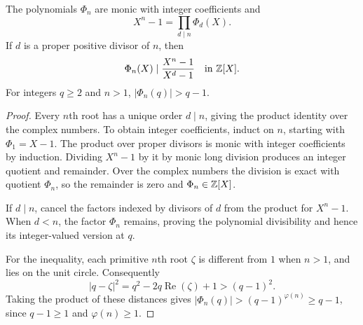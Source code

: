 \begin{lemma}
\label{lem:wedderburn-cyclotomic}
The polynomials $\Phi_n$ are monic with integer coefficients and
\[
X^n-1=\prod_{d\mid n}\Phi_d(X).
\]
If $d$ is a proper positive divisor of $n$, then
\[
\Phi_n(X)\mid\frac{X^n-1}{X^d-1}\quad\text{in }\mathbb Z[X].
\]
For integers $q\ge2$ and $n>1$, $|\Phi_n(q)|>q-1$.
\end{lemma}
\begin{proof}
Every $n$th root has a unique order $d\mid n$, giving the product
identity over the complex numbers. To obtain integer coefficients,
induct on $n$, starting with $\Phi_1=X-1$. The product over proper
divisors is monic with integer coefficients by induction. Dividing
$X^n-1$ by it by monic long division produces an integer quotient
and remainder. Over the complex numbers the division is exact with
quotient $\Phi_n$, so the remainder is zero and $\Phi_n\in\mathbb Z[X]$.

If $d\mid n$, cancel the factors indexed by divisors of $d$ from the
product for $X^n-1$. When $d<n$, the factor $\Phi_n$ remains, proving
the polynomial divisibility and hence its integer-valued version at $q$.

For the inequality, each primitive $n$th root $\zeta$ is different from
$1$ when $n>1$, and lies on the unit circle. Consequently
\[
|q-\zeta|^2=q^2-2q\operatorname{Re}(\zeta)+1>(q-1)^2.
\]
Taking the product of these distances gives
$|\Phi_n(q)|>(q-1)^{\varphi(n)}\ge q-1$, since $q-1\ge1$
and $\varphi(n)\ge1$.
\end{proof}


